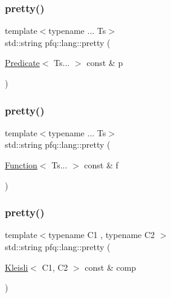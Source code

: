 \mbox{\label{namespacepfq_1_1lang_a365497365bebd1ef44492e8027a6b3c0}} 
\subsubsection{\texorpdfstring{pretty()}{pretty()}\hspace{0.1cm}{\footnotesize\ttfamily [5/7]}}
{\footnotesize\ttfamily template$<$typename ... Ts$>$ \\
std\+::string pfq\+::lang\+::pretty (\begin{DoxyParamCaption}\item[{\hyperlink{structpfq_1_1lang_1_1Predicate}{Predicate}$<$ Ts... $>$ const \&}]{p }\end{DoxyParamCaption})\hspace{0.3cm}{\ttfamily [inline]}}

\mbox{\label{namespacepfq_1_1lang_ae99e641e0f2d5461ed2c09ce92a82156}} 
\subsubsection{\texorpdfstring{pretty()}{pretty()}\hspace{0.1cm}{\footnotesize\ttfamily [6/7]}}
{\footnotesize\ttfamily template$<$typename ... Ts$>$ \\
std\+::string pfq\+::lang\+::pretty (\begin{DoxyParamCaption}\item[{\hyperlink{structpfq_1_1lang_1_1Function}{Function}$<$ Ts... $>$ const \&}]{f }\end{DoxyParamCaption})\hspace{0.3cm}{\ttfamily [inline]}}

\mbox{\label{namespacepfq_1_1lang_a11d127d1c25e1628bc76dd2067467dcd}} 
\subsubsection{\texorpdfstring{pretty()}{pretty()}\hspace{0.1cm}{\footnotesize\ttfamily [7/7]}}
{\footnotesize\ttfamily template$<$typename C1 , typename C2 $>$ \\
std\+::string pfq\+::lang\+::pretty (\begin{DoxyParamCaption}\item[{\hyperlink{structpfq_1_1lang_1_1Kleisli}{Kleisli}$<$ C1, C2 $>$ const \&}]{comp }\end{DoxyParamCaption})\hspace{0.3cm}{\ttfamily [inline]}}

